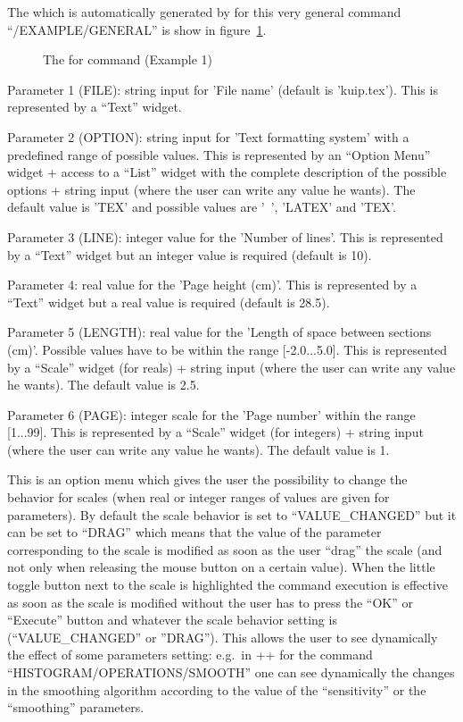 The \CAP{} which is automatically generated by \KUIPMotif{} for this
very general command  ``/EXAMPLE/GENERAL'' is show in
figure~\ref{ref:FIGPKEX1}.

\begin{figure}[tb]
\vspace{-1\baselineskip}
\caption{The \CAP{} for command \protect{} (Example 1)}
\label{ref:FIGPKEX1}
\end{figure}

\begin{EnumZB}
\item  Parameter 1 (FILE): string input for 'File name' (default is 
'kuip.tex').  This is represented by a ``Text'' widget.
\item  Parameter 2 (OPTION): string input for 'Text formatting system' with
a predefined range of possible values. This is represented by an ``Option 
Menu'' widget + access to a ``List'' widget with the complete description
of the possible options + string input (where the user can write any value
he wants). The default value is 'TEX' and possible values are '~', 'LATEX' 
and 'TEX'.
\item  Parameter 3 (LINE): integer value for the 'Number of lines'. 
This is represented by a ``Text'' widget but an integer value is required 
(default is 10).
\item  Parameter 4: real value for the 'Page height (cm)'. 
This is represented by a ``Text'' widget but a real value is required 
(default is 28.5).
\item  Parameter 5 (LENGTH): real value for the 'Length of space
between sections (cm)'. Possible values have to be within the range
[-2.0...5.0]. This is represented by a ``Scale'' widget (for reals) + 
string input (where the user can write any value he wants). The default value 
is 2.5.
\item  Parameter 6 (PAGE): integer scale for the 'Page number' within the range 
[1...99]. This is represented by a ``Scale'' widget (for integers) +
string input (where the user can write any value he wants). The default value
is 1.
\item This is an option menu which gives the user the possibility to change
the behavior for scales (when real or integer ranges of values are given
for parameters). By default the scale behavior is set to ``VALUE\_CHANGED''
but it can be set to ``DRAG'' which means that the value of the parameter
corresponding to the scale is modified as soon as the user ``drag'' the
scale (and not only when releasing the mouse button on a certain value). 
When the little toggle button next to the scale is highlighted
the command execution is effective as soon as the scale is modified 
without the user has to press the ``OK'' or ``Execute'' button and
whatever the scale behavior setting is (``VALUE\_CHANGED'' or ''DRAG''). 
This allows the user to see dynamically the effect of some parameters
setting: e.g.\ in \PAW++{} for the command ``HISTOGRAM/OPERATIONS/SMOOTH'' 
one can see dynamically the changes in the smoothing algorithm according 
to the value of the ``sensitivity'' or the ``smoothing'' parameters.
\end{EnumZB}

